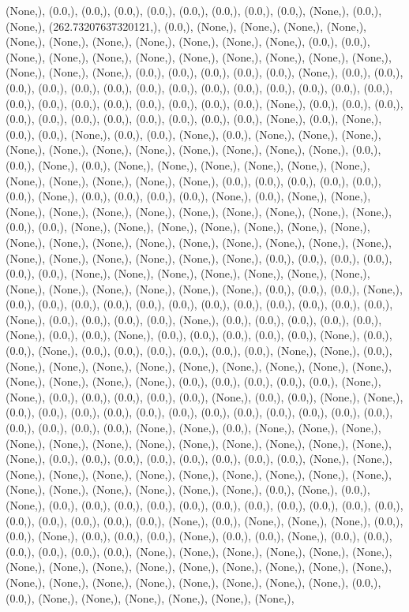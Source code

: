 \documentclass{article}
\begin{document}
(None,), (0.0,), (0.0,), (0.0,), (0.0,), (0.0,), (0.0,), (0.0,), (0.0,), (None,), (0.0,), (None,), (262.73207637320121,), (0.0,), (None,), (None,), (None,), (None,), (None,), (None,), (None,), (None,), (None,), (None,), (None,), (0.0,), (0.0,), (None,), (None,), (None,), (None,), (None,), (None,), (None,), (None,), (None,), (None,), (None,), (None,), (0.0,), (0.0,), (0.0,), (0.0,), (0.0,), (None,), (0.0,), (0.0,), (0.0,), (0.0,), (0.0,), (0.0,), (0.0,), (0.0,), (0.0,), (0.0,), (0.0,), (0.0,), (0.0,), (0.0,), (0.0,), (0.0,), (0.0,), (0.0,), (0.0,), (0.0,), (0.0,), (0.0,), (None,), (0.0,), (0.0,), (0.0,), (0.0,), (0.0,), (0.0,), (0.0,), (0.0,), (0.0,), (0.0,), (0.0,), (None,), (0.0,), (None,), (0.0,), (0.0,), (None,), (0.0,), (0.0,), (None,), (0.0,), (None,), (None,), (None,), (None,), (None,), (None,), (None,), (None,), (None,), (None,), (None,), (0.0,), (0.0,), (None,), (0.0,), (None,), (None,), (None,), (None,), (None,), (None,), (None,), (None,), (None,), (None,), (None,), (0.0,), (0.0,), (0.0,), (0.0,), (0.0,), (0.0,), (None,), (0.0,), (0.0,), (0.0,), (0.0,), (None,), (0.0,), (None,), (None,), (None,), (None,), (None,), (None,), (None,), (None,), (None,), (None,), (None,), (0.0,), (0.0,), (None,), (None,), (None,), (None,), (None,), (None,), (None,), (None,), (None,), (None,), (None,), (None,), (None,), (None,), (None,), (None,), (None,), (None,), (None,), (None,), (None,), (None,), (0.0,), (0.0,), (0.0,), (0.0,), (0.0,), (0.0,), (None,), (None,), (None,), (None,), (None,), (None,), (None,), (None,), (None,), (None,), (None,), (None,), (None,), (0.0,), (0.0,), (0.0,), (None,), (0.0,), (0.0,), (0.0,), (0.0,), (0.0,), (0.0,), (0.0,), (0.0,), (0.0,), (0.0,), (0.0,), (0.0,), (None,), (0.0,), (0.0,), (0.0,), (0.0,), (None,), (0.0,), (0.0,), (0.0,), (0.0,), (0.0,), (None,), (0.0,), (0.0,), (None,), (0.0,), (0.0,), (0.0,), (0.0,), (0.0,), (None,), (0.0,), (0.0,), (None,), (0.0,), (0.0,), (0.0,), (0.0,), (0.0,), (0.0,), (None,), (None,), (0.0,), (None,), (None,), (None,), (None,), (None,), (None,), (None,), (None,), (None,), (None,), (None,), (None,), (None,), (0.0,), (0.0,), (0.0,), (0.0,), (0.0,), (None,), (None,), (0.0,), (0.0,), (0.0,), (0.0,), (0.0,), (None,), (0.0,), (0.0,), (None,), (None,), (0.0,), (0.0,), (0.0,), (0.0,), (0.0,), (0.0,), (0.0,), (0.0,), (0.0,), (0.0,), (0.0,), (0.0,), (0.0,), (0.0,), (0.0,), (0.0,), (None,), (None,), (0.0,), (None,), (None,), (None,), (None,), (None,), (None,), (None,), (None,), (None,), (None,), (None,), (None,), (None,), (0.0,), (0.0,), (0.0,), (0.0,), (0.0,), (0.0,), (0.0,), (0.0,), (None,), (None,), (None,), (None,), (None,), (None,), (None,), (None,), (None,), (None,), (None,), (None,), (None,), (None,), (None,), (None,), (None,), (0.0,), (None,), (0.0,), (None,), (0.0,), (0.0,), (0.0,), (0.0,), (0.0,), (0.0,), (0.0,), (0.0,), (0.0,), (0.0,), (0.0,), (0.0,), (0.0,), (0.0,), (0.0,), (0.0,), (None,), (0.0,), (None,), (None,), (None,), (0.0,), (0.0,), (None,), (0.0,), (0.0,), (0.0,), (None,), (0.0,), (0.0,), (None,), (0.0,), (0.0,), (0.0,), (0.0,), (0.0,), (0.0,), (None,), (None,), (None,), (None,), (None,), (None,), (None,), (None,), (None,), (None,), (None,), (None,), (None,), (None,), (None,), (None,), (None,), (None,), (None,), (None,), (None,), (None,), (None,), (0.0,), (0.0,), (None,), (None,), (None,), (None,), (None,), (None,), 
\end{document}
